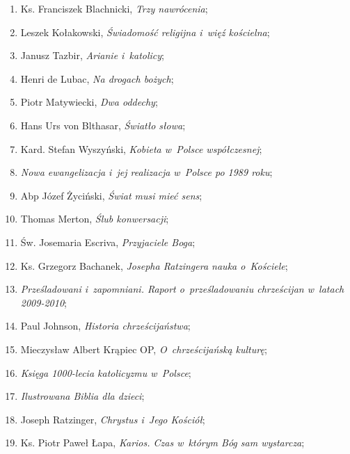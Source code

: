 \documentclass[a4paper,11pt]{article}
\begin{document}
\begin{enumerate}
\item Ks. Franciszek Blachnicki, \textit{Trzy nawrócenia};

\item Leszek Kołakowski, \textit{Świadomość religijna i~więź kościelna};

\item Janusz Tazbir, \textit{Arianie i~katolicy};

\item Henri de Lubac, \textit{Na drogach bożych};

\item Piotr Matywiecki, \textit{Dwa oddechy};

\item Hans Urs von Blthasar, \textit{Światło słowa};

\item Kard. Stefan Wyszyński, \textit{Kobieta w~Polsce współczesnej};

\item \textit{Nowa ewangelizacja i~jej realizacja w~Polsce po 1989 roku};

\item Abp Józef Życiński, \textit{Świat musi mieć sens};

\item Thomas Merton, \textit{Ślub konwersacji};

\item Św. Josemaria Escriva, \textit{Przyjaciele Boga};

\item Ks. Grzegorz Bachanek, \textit{Josepha Ratzingera nauka o~Kościele};

\item \textit{Prześladowani i~zapomniani. Raport o~prześladowaniu
    chrześcijan w~latach 2009-2010};

\item Paul Johnson, \textit{Historia chrześcijaństwa};

\item Mieczysław Albert Krąpiec OP, \textit{O~chrześcijańską kulturę};

\item \textit{Księga 1000-lecia katolicyzmu w~Polsce};

\item \textit{Ilustrowana Biblia dla dzieci};

\item Joseph Ratzinger, \textit{Chrystus i~Jego Kościół};

\item Ks. Piotr Paweł Łapa, \textit{Karios. Czas w~którym Bóg sam
    wystarcza};


\end{enumerate}
\end{document}
